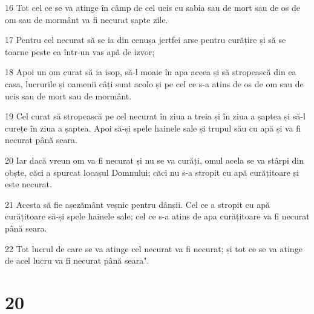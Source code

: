 \par 16 Tot cel ce se va atinge în câmp de cel ucis cu sabia sau de mort sau de os de om sau de mormânt va fi necurat șapte zile.
\par 17 Pentru cel necurat să se ia din cenușa jertfei arse pentru curățire și să se toarne peste ea într-un vas apă de izvor;
\par 18 Apoi un om curat să ia isop, să-l moaie în apa aceea și să stropească din ea casa, lucrurile și oamenii câți sunt acolo și pe cel ce s-a atins de os de om sau de ucis sau de mort sau de mormânt.
\par 19 Cel curat să stropească pe cel necurat în ziua a treia și în ziua a șaptea și să-l curețe în ziua a șaptea. Apoi să-și spele hainele sale și trupul său cu apă și va fi necurat până seara.
\par 20 Iar dacă vreun om va fi necurat și nu se va curăți, omul acela se va stârpi din obște, căci a spurcat locașul Domnului; căci nu s-a stropit cu apă curățitoare și este necurat.
\par 21 Acesta să fie așezământ veșnic pentru dânșii. Cel ce a stropit cu apă curățitoare să-și spele hainele sale; cel ce s-a atins de apa curățitoare va fi necurat până seara.
\par 22 Tot lucrul de care se va atinge cel necurat va fi necurat; și tot ce se va atinge de acel lucru va fi necurat până seara".

\chapter{20}

